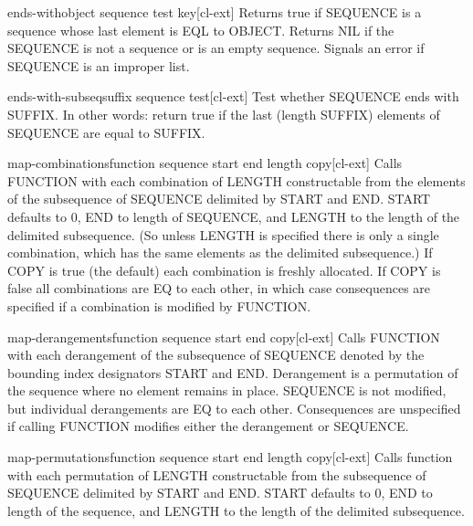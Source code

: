 \begin{function}{ends-with}{object sequence \key test key}[cl-ext]
  Returns true if SEQUENCE is a sequence whose last element is EQL to OBJECT.
Returns NIL if the SEQUENCE is not a sequence or is an empty sequence. Signals
an error if SEQUENCE is an improper list.
\end{function}

\begin{function}{ends-with-subseq}{suffix sequence \key test}[cl-ext]
  Test whether SEQUENCE ends with SUFFIX. In other words: return true if
the last (length SUFFIX) elements of SEQUENCE are equal to SUFFIX.
\end{function}

\begin{function}{map-combinations}{function sequence \key start end length copy}[cl-ext]
  Calls FUNCTION with each combination of LENGTH constructable from the
elements of the subsequence of SEQUENCE delimited by START and END. START
defaults to 0, END to length of SEQUENCE, and LENGTH to the length of the
delimited subsequence. (So unless LENGTH is specified there is only a single
combination, which has the same elements as the delimited subsequence.) If
COPY is true (the default) each combination is freshly allocated. If COPY is
false all combinations are EQ to each other, in which case consequences are
specified if a combination is modified by FUNCTION.
\end{function}

\begin{function}{map-derangements}{function sequence \key start end copy}[cl-ext]
  Calls FUNCTION with each derangement of the subsequence of SEQUENCE denoted
by the bounding index designators START and END. Derangement is a permutation
of the sequence where no element remains in place. SEQUENCE is not modified,
but individual derangements are EQ to each other. Consequences are unspecified
if calling FUNCTION modifies either the derangement or SEQUENCE.
\end{function}

\begin{function}{map-permutations}{function sequence \key start end length copy}[cl-ext]
  Calls function with each permutation of LENGTH constructable
from the subsequence of SEQUENCE delimited by START and END. START
defaults to 0, END to length of the sequence, and LENGTH to the
length of the delimited subsequence.
\end{function}

